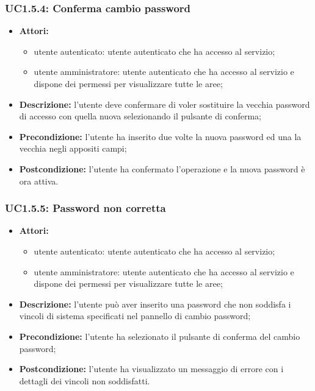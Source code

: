 \subsubsection{UC1.5.4: Conferma cambio password}

\begin{itemize}
   	\item \textbf{Attori:}
    \begin{itemize}
    	\item utente autenticato: utente autenticato che ha accesso al servizio;
    	\item utente amministratore: utente autenticato che ha accesso al servizio e dispone dei permessi per visualizzare tutte le aree;
	\end{itemize}
    \item \textbf{Descrizione:} l'utente deve confermare di voler sostituire la vecchia password di accesso con quella nuova selezionando il pulsante di conferma;
    \item \textbf{Precondizione:} l'utente ha inserito due volte la nuova password ed una la vecchia negli appositi campi;
    \item \textbf{Postcondizione:} l'utente ha confermato l'operazione e la nuova password è ora attiva.
\end{itemize}

\subsubsection{UC1.5.5: Password non corretta}

\begin{itemize}
   	\item \textbf{Attori:}
    \begin{itemize}
    	\item utente autenticato: utente autenticato che ha accesso al servizio;
    	\item utente amministratore: utente autenticato che ha accesso al servizio e dispone dei permessi per visualizzare tutte le aree;
	\end{itemize}
    \item \textbf{Descrizione:} l'utente può aver inserito una password che non soddisfa i vincoli di sistema specificati nel pannello di cambio password;
    \item \textbf{Precondizione:} l'utente ha selezionato il pulsante di conferma del cambio password;
    \item \textbf{Postcondizione:} l'utente ha visualizzato un messaggio di errore con i dettagli dei vincoli non soddisfatti.
\end{itemize}

